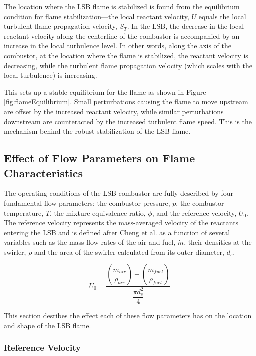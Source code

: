 The location where the LSB flame is stabilized is found from the equilibrium condition for flame stabilization---the local reactant velocity, \(U\) equals the local turbulent flame propagation velocity, \(S_T\).
In the LSB, the decrease in the local reactant velocity along the centerline of the combustor is accompanied by an increase in the local turbulence level.
In other words, along the axis of the combustor, at the location where the flame is stabilized, the reactant velocity is decreasing, while the turbulent flame propagation velocity (which scales with the local turbulence) is increasing.

This sets up a stable equilibrium for the flame as shown in Figure \ref{fig:flameEquilibrium}.
Small perturbations causing the flame to move upstream are offset by the increased reactant velocity, while similar perturbations downstream are counteracted by the increased turbulent flame speed.
This is the mechanism behind the robust stabilization of the LSB flame.

\subsection{Effect of Flow Parameters on Flame Characteristics}

The operating conditions of the LSB combustor are fully described by four fundamental flow parameters; the combustor pressure, \(p\), the combustor temperature, \(T\), the mixture equivalence ratio, \(\phi\), and the reference velocity, \(U_0\).
The reference velocity represents the mass-averaged velocity of the reactants entering the LSB and is defined after Cheng et al.\cite{2000-cheng} as a function of several variables such as the mass flow rates of the air and fuel, \(\dot{m}\), their densities at the swirler, \(\rho\) and the area of the swirler calculated from its outer diameter, \(d_s\).

\begin{equation}
U_0 = \frac{ \left( \dfrac{ \dot{m}_{air} }{ \rho_{air} } \right) + \left( \dfrac{ \dot{m}_{fuel} }{ \rho_{fuel} }\right) }{ \dfrac{\pi d_s^2 }{4} }
\label{eqn:referenceVelocity}
\end{equation}

This section desribes the effect each of these flow parameters has on the location and shape of the LSB flame.

\subsubsection{Reference Velocity}

